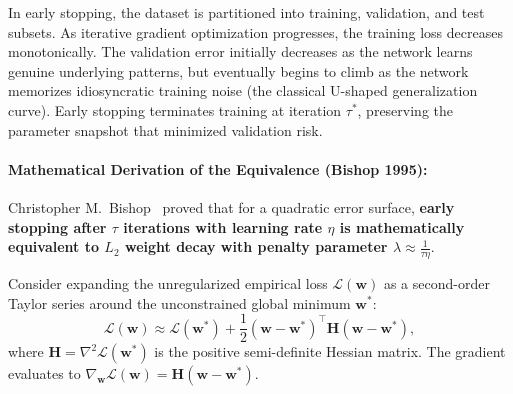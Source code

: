 In early stopping, the dataset is partitioned into training, validation, and test subsets. As iterative gradient optimization progresses, the training loss decreases monotonically. The validation error initially decreases as the network learns genuine underlying patterns, but eventually begins to climb as the network memorizes idiosyncratic training noise (the classical U-shaped generalization curve). Early stopping terminates training at iteration $\tau^*$, preserving the parameter snapshot that minimized validation risk.

\paragraph{Mathematical Derivation of the Equivalence (Bishop 1995):}
Christopher M.~Bishop~\cite{bishop1995training} proved that for a quadratic error surface, \textbf{early stopping after $\tau$ iterations with learning rate $\eta$ is mathematically equivalent to $L_2$ weight decay with penalty parameter $\lambda \approx \frac{1}{\tau \eta}$}.

Consider expanding the unregularized empirical loss $\mathcal{L}(\mathbf{w})$ as a second-order Taylor series around the unconstrained global minimum $\mathbf{w}^*$:
\begin{equation}
\mathcal{L}(\mathbf{w}) \approx \mathcal{L}(\mathbf{w}^*) + \frac{1}{2}(\mathbf{w} - \mathbf{w}^*)^\top \mathbf{H} (\mathbf{w} - \mathbf{w}^*),
\label{eq:quadratic_approx_loss}
\end{equation}
where $\mathbf{H} = \nabla^2 \mathcal{L}(\mathbf{w}^*)$ is the positive semi-definite Hessian matrix. The gradient evaluates to $\nabla_{\mathbf{w}} \mathcal{L}(\mathbf{w}) = \mathbf{H}(\mathbf{w} - \mathbf{w}^*)$.

